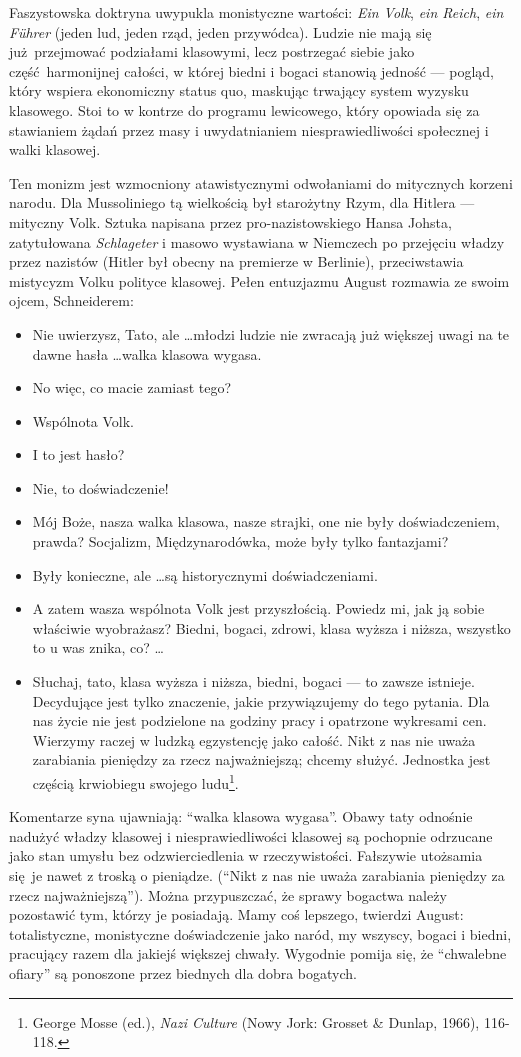 \documentclass[12pt]{book}
\newcommand{\dialog}[2]{
  \begin{itemize}[%
    ,label=#1: 
    ]
    \item #2
  \end{itemize}
}
\begin{document}
Faszystowska doktryna uwypukla monistyczne wartości: \textit{Ein Volk}, \textit{ein Reich}, \textit{ein Führer} (jeden lud, jeden rząd, jeden przywódca). Ludzie nie mają się już przejmować podziałami klasowymi, lecz postrzegać siebie jako część harmonijnej całości, w której biedni i bogaci stanowią jedność — pogląd, który wspiera ekonomiczny status quo, maskując trwający system wyzysku klasowego. Stoi to w kontrze do programu lewicowego, który opowiada się za stawianiem żądań przez masy i uwydatnianiem niesprawiedliwości społecznej i walki klasowej.

Ten monizm jest wzmocniony atawistycznymi odwołaniami do mitycznych korzeni narodu. Dla Mussoliniego tą wielkością był starożytny Rzym, dla Hitlera — mityczny Volk. Sztuka napisana przez pro-nazistowskiego Hansa Johsta, zatytułowana \textit{Schlageter} i masowo wystawiana w Niemczech po przejęciu władzy przez nazistów (Hitler był obecny na premierze w Berlinie), przeciwstawia mistycyzm Volku polityce klasowej. Pełen entuzjazmu August rozmawia ze swoim ojcem, Schneiderem:

\dialog{August}{Nie uwierzysz, Tato, ale \ldots młodzi ludzie nie zwracają już większej uwagi na te dawne hasła \ldots walka klasowa wygasa.}
\dialog{Schneider}{No więc, co macie zamiast tego?}
\dialog{August}{Wspólnota Volk.}
\dialog{Schneider}{I to jest hasło?}
\dialog{August}{Nie, to doświadczenie!}
\dialog{Schneider}{Mój Boże, nasza walka klasowa, nasze strajki, one nie były doświadczeniem, prawda? Socjalizm, Międzynarodówka, może były tylko fantazjami?}
\dialog{August}{Były konieczne, ale \ldots są historycznymi doświadczeniami.}
\dialog{Schneider}{A zatem wasza wspólnota Volk jest przyszłością. Powiedz mi, jak ją sobie właściwie wyobrażasz? Biedni, bogaci, zdrowi, klasa wyższa i niższa, wszystko to u was znika, co? \ldots}
\dialog{August}{Słuchaj, tato, klasa wyższa i niższa, biedni, bogaci — to zawsze istnieje. Decydujące jest tylko znaczenie, jakie przywiązujemy do tego pytania. Dla nas życie nie jest podzielone na godziny pracy i opatrzone wykresami cen. Wierzymy raczej w ludzką egzystencję jako całość. Nikt z nas nie uważa zarabiania pieniędzy za rzecz najważniejszą; chcemy służyć. Jednostka jest częścią krwiobiegu swojego ludu\footnote{George Mosse (ed.), \textit{Nazi Culture} (Nowy Jork: Grosset \& Dunlap, 1966), 116-118.}.}

Komentarze syna ujawniają: ``walka klasowa wygasa''. Obawy taty odnośnie nadużyć władzy klasowej i niesprawiedliwości klasowej są pochopnie odrzucane jako stan umysłu bez odzwierciedlenia w rzeczywistości. Fałszywie utożsamia się je nawet z troską o pieniądze. (``Nikt z nas nie uważa zarabiania pieniędzy za rzecz najważniejszą''). Można przypuszczać, że sprawy bogactwa należy pozostawić tym, którzy je posiadają. Mamy coś lepszego, twierdzi August: totalistyczne, monistyczne doświadczenie jako naród, my wszyscy, bogaci i biedni, pracujący razem dla jakiejś większej chwały. Wygodnie pomija się, że ``chwalebne ofiary'' są ponoszone przez biednych dla dobra bogatych.
\end{document}
